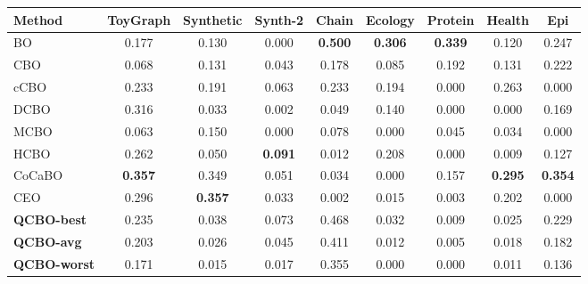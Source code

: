 \begin{tabular}{@{}lcccccccc@{}}
\toprule
\textbf{Method} & ToyGraph & Synthetic & Synth-2 & Chain & Ecology & Protein & Health & Epi \\
\midrule
BO & 0.177 & 0.130 & 0.000 & \textbf{0.500} & \textbf{0.306} & \textbf{0.339} & 0.120 & 0.247 \\
CBO & 0.068 & 0.131 & 0.043 & 0.178 & 0.085 & 0.192 & 0.131 & 0.222 \\
cCBO & 0.233 & 0.191 & 0.063 & 0.233 & 0.194 & 0.000 & 0.263 & 0.000 \\
DCBO & 0.316 & 0.033 & 0.002 & 0.049 & 0.140 & 0.000 & 0.000 & 0.169 \\
MCBO & 0.063 & 0.150 & 0.000 & 0.078 & 0.000 & 0.045 & 0.034 & 0.000 \\
HCBO & 0.262 & 0.050 & \textbf{0.091} & 0.012 & 0.208 & 0.000 & 0.009 & 0.127 \\
CoCaBO & \textbf{0.357} & 0.349 & 0.051 & 0.034 & 0.000 & 0.157 & \textbf{0.295} & \textbf{0.354} \\
CEO & 0.296 & \textbf{0.357} & 0.033 & 0.002 & 0.015 & 0.003 & 0.202 & 0.000 \\
\midrule
\textbf{QCBO-best} & 0.235 & 0.038 & 0.073 & 0.468 & 0.032 & 0.009 & 0.025 & 0.229 \\
\textbf{QCBO-avg} & 0.203 & 0.026 & 0.045 & 0.411 & 0.012 & 0.005 & 0.018 & 0.182 \\
\textbf{QCBO-worst} & 0.171 & 0.015 & 0.017 & 0.355 & 0.000 & 0.000 & 0.011 & 0.136 \\
\bottomrule
\end{tabular}

